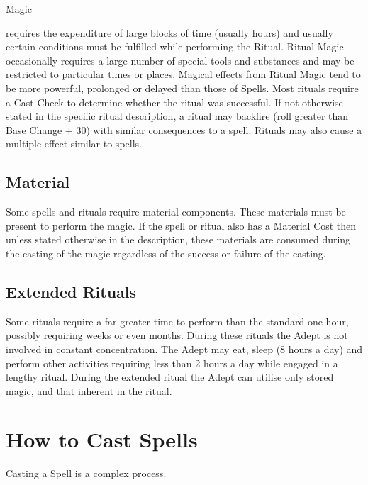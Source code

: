 \begin{Chapter}{Magic}
\begin{Description}
\item[Ritual Magic] requires the expenditure of large blocks of time
  (usually hours) and usually certain conditions must be fulfilled
  while performing the Ritual.  Ritual Magic occasionally requires a
  large number of special tools and substances and may be restricted
  to particular times or places.  Magical effects from Ritual Magic
  tend to be more powerful, prolonged or delayed than those of Spells.
  Most rituals require a Cast Check to determine whether the ritual
  was successful.  If not otherwise stated in the specific ritual
  description, a ritual may backfire (roll greater than Base Change +
  30) with similar consequences to a spell.  Rituals may also cause a
  multiple effect similar to spells.

\end{Description}

\subsection{Material}

Some spells and rituals require material components.  These materials
must be present to perform the magic.  If the spell or ritual also has
a Material Cost then unless stated otherwise in the description,
these materials are consumed during the casting of the magic
regardless of the success or failure of the casting.


\subsection{Extended Rituals}

Some rituals require a far greater time to perform than the standard
one hour, possibly requiring weeks or even months.  During these
rituals the Adept is not involved in constant concentration.  The
Adept may eat, sleep (8 hours a day) and perform other activities
requiring less than 2 hours a day while engaged in a lengthy ritual.
During the extended ritual the Adept can utilise only stored magic,
and that inherent in the ritual.

\section{How to Cast Spells}
\label{magic:howtocast}

Casting a Spell is a complex process. 


\end{Chapter}
